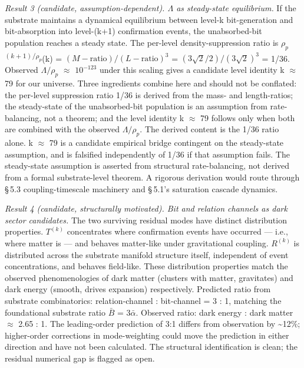 \documentclass[11pt,oneside]{report}
\theoremstyle{definition}
\theoremstyle{remark}
\begin{document}
\emph{Result 3 (candidate, assumption-dependent). \ensuremath{\Lambda} as steady-state
equilibrium.} If the substrate maintains a dynamical equilibrium between
level-k bit-generation and bit-absorption into level-(k+1) confirmation
events, the unabsorbed-bit population reaches a steady state. The
per-level density-suppression ratio is
\ensuremath{\rho_{p}}\textsuperscript{\ensuremath{(k+1)/\rho_{p}}}(k) = \ensuremath{(M-\text{ratio})/(L-\text{ratio})^{3}} =
\ensuremath{(3\sqrt{2}/2)/(3\sqrt{2})^{3}} = 1/36. Observed \ensuremath{\Lambda /\rho_{p}} \ensuremath{\approx} \ensuremath{10^{-123}} under this scaling gives
a candidate level identity k \ensuremath{\approx} 79 for our universe. Three ingredients
combine here and should not be conflated: the per-level suppression ratio
1/36 is derived from the mass- and length-ratios; the steady-state of the
unabsorbed-bit population is an assumption from rate-balancing, not a
theorem; and the level identity k \ensuremath{\approx} 79 follows only when both are combined
with the observed \ensuremath{\Lambda /\rho_{p}}. The derived content is the 1/36 ratio alone.
k \ensuremath{\approx} 79 is a candidate empirical bridge contingent on the steady-state
assumption, and is falsified independently of 1/36 if that assumption
fails. The steady-state
assumption is asserted from structural rate-balancing, not derived from
a formal substrate-level theorem. A rigorous derivation would route
through \S\,5.3 coupling-timescale machinery and \S\,5.1's saturation cascade
dynamics.

\emph{Result 4 (candidate, structurally motivated). Bit and relation
channels as dark sector candidates.} The two surviving residual modes
have distinct distribution properties. \ensuremath{T^{(k)}} concentrates where
confirmation events have occurred --- i.e., where matter is --- and
behaves matter-like under gravitational coupling. \ensuremath{R^{(k)}} is
distributed across the substrate manifold structure itself, independent
of event concentrations, and behaves field-like. These distribution
properties match the observed phenomenologies of dark matter (clusters
with matter, gravitates) and dark energy (smooth, drives expansion)
respectively. Predicted ratio from substrate combinatorics:
relation-channel : bit-channel = 3 : 1, matching the foundational
substrate ratio \ensuremath{\bar{B}} = \ensuremath{3\bar{\alpha}.} Observed ratio: dark energy : dark matter \ensuremath{\approx} 2.65
: 1. The leading-order prediction of 3:1 differs from observation by
\textasciitilde12\%; higher-order corrections in mode-weighting could
move the prediction in either direction and have not been calculated.
The structural identification is clean; the residual numerical gap is
flagged as open.
\end{document}
